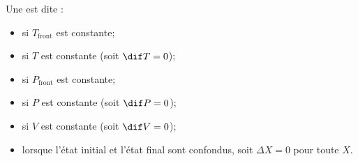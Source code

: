 \begin{definitions}
Une  est dite :

\begin{itemize}
\item {} si $T_{\mathrm{front}}$ est constante;
\item {} si $T$ est constante (soit $\dif T = 0$);
\item {} si $P_{\mathrm{front}}$ est constante;
\item {} si $P$ est constante (soit $\dif P = 0$);
\item {} si $V$ est constante (soit $\dif V = 0$);
\item {} lorsque l'état initial et l'état final sont confondus, soit $\Delta X = 0$ pour toute  $X$.
\end{itemize}
\end{definitions}